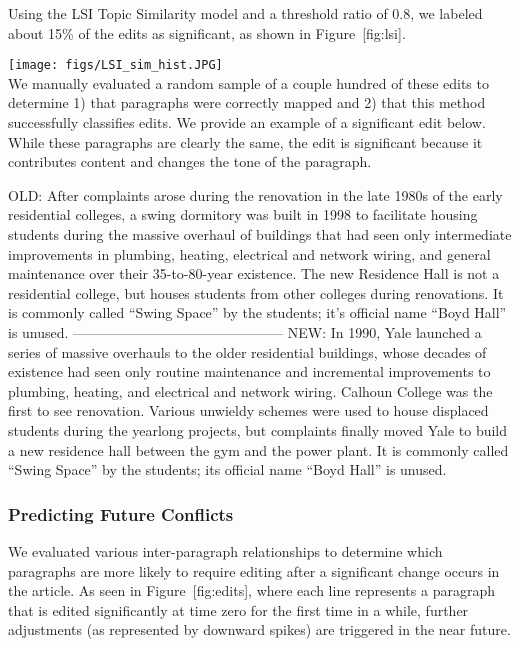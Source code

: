 Using the LSI Topic Similarity model and a threshold ratio of 0.8, we
labeled about 15\% of the edits as significant, as shown in
Figure~{[}fig:lsi{]}.

\texttt{[image: figs/LSI\_sim\_hist.JPG]}\\

We manually evaluated a random sample of a couple hundred of these edits
to determine 1) that paragraphs were correctly mapped and 2) that this
method successfully classifies edits. We provide an example of a
significant edit below. While these paragraphs are clearly the same, the
edit is significant because it contributes content and changes the tone
of the paragraph.

OLD: After complaints arose during the renovation in the late 1980s of
the early residential colleges, a swing dormitory was built in 1998 to
facilitate housing students during the massive overhaul of buildings
that had seen only intermediate improvements in plumbing, heating,
electrical and network wiring, and general maintenance over their
35-to-80-year existence. The new Residence Hall is not a residential
college, but houses students from other colleges during renovations. It
is commonly called ``Swing Space'' by the students; it's official name
``Boyd Hall'' is unused. ---------------------------------------------
NEW: In 1990, Yale launched a series of massive overhauls to the older
residential buildings, whose decades of existence had seen only routine
maintenance and incremental improvements to plumbing, heating, and
electrical and network wiring. Calhoun College was the first to see
renovation. Various unwieldy schemes were used to house displaced
students during the yearlong projects, but complaints finally moved Yale
to build a new residence hall between the gym and the power plant. It is
commonly called ``Swing Space'' by the students; its official name
``Boyd Hall'' is unused.

\subsubsection{Predicting Future
Conflicts}\label{predicting-future-conflicts}

We evaluated various inter-paragraph relationships to determine which
paragraphs are more likely to require editing after a significant change
occurs in the article. As seen in Figure~{[}fig:edits{]}, where each
line represents a paragraph that is edited significantly at time zero
for the first time in a while, further adjustments (as represented by
downward spikes) are triggered in the near future.

